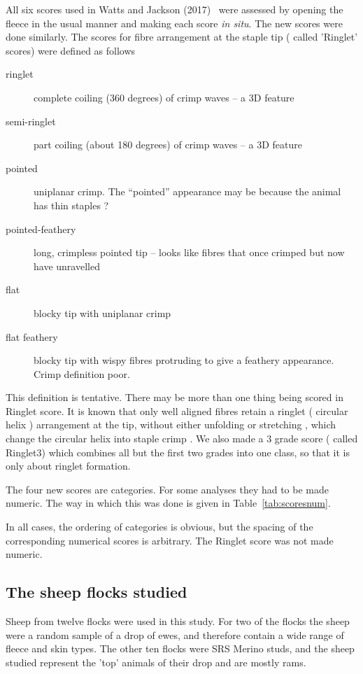 \documentclass[titlepage]{article}  %
\begin{document}
All six scores used in Watts and Jackson (2017)~\cite{watt:17} were assessed by opening the fleece in the usual manner and making each score {\em in situ}. The new scores were done similarly. The scores for fibre arrangement at the staple tip ( called 'Ringlet' scores) were defined as follows
\begin{description}
\item[ringlet] complete coiling (360 degrees) of crimp waves – a 3D feature 
\item[semi-ringlet] part coiling (about 180 degrees) of crimp waves – a 3D feature
\item[pointed] uniplanar crimp. The “pointed” appearance may be because the animal has thin staples ?
\item[pointed-feathery] long, crimpless pointed tip – looks like fibres that once crimped but now have unravelled
\item[flat] blocky tip with uniplanar crimp
\item[flat feathery] blocky tip with wispy fibres protruding to give a feathery appearance. Crimp definition poor.
\end{description}

This definition is tentative. There may be more than one thing being scored in Ringlet score. It is known that only well aligned fibres retain a ringlet ( circular helix ) arrangement at the tip, without either unfolding or stretching , which change the circular helix into staple crimp .  We also made a 3 grade score ( called Ringlet3) which combines all but the first two grades into one class, so that it is only about ringlet formation.

The four new scores are categories. For some analyses they had to be made numeric. The way in which this was done is given in Table~\ref{tab:scoresnum}.

In all cases, the ordering of categories is obvious, but the spacing of the corresponding numerical scores is arbitrary. The Ringlet score was not made numeric.

\subsection{The sheep flocks studied}
Sheep from twelve flocks were used in this study. For two of the flocks the sheep were a random sample of a drop of ewes, and therefore contain a wide range of fleece and skin types. The other ten flocks were SRS Merino studs, and the sheep studied represent the 'top' animals of their drop and are mostly rams.
\end{document}
